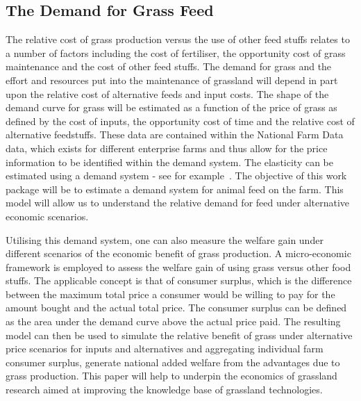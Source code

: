 \documentclass[12pt]{report}
\begin{document}
\subsection{The Demand for Grass Feed}
The relative cost of grass production versus the use of other feed stuffs relates to a number of factors including the cost of fertiliser, the opportunity cost of grass maintenance and the cost of other feed stuffs. The demand for grass and the effort and resources put into the maintenance of grassland will depend in part upon the relative cost of alternative feeds and input costs. The shape of the demand curve for grass will be estimated as a function of the price of grass as defined by the cost of inputs, the opportunity cost of time and the relative cost of alternative feedstuffs. These data are contained within the National Farm Data data, which exists for different enterprise farms and thus allow for the price information to be identified within the demand system. The elasticity can be estimated using a demand system - see for example~\citep{deaton80}. The objective of this work package will be to estimate a demand system for animal feed on the farm. This model will allow us to understand the relative demand for feed under alternative economic scenarios.

Utilising this demand system, one can also measure the welfare gain under different scenarios of the economic benefit of grass production. A micro-economic framework is employed to assess the welfare gain of using grass versus other food stuffs. The applicable concept  is that of consumer surplus, which is the difference between the maximum total price a consumer would be willing to pay for the amount bought and the actual total price. The consumer surplus can be defined as the area under the demand curve above the actual price paid. The resulting model can then be used to simulate the relative benefit of grass under alternative price scenarios for inputs and alternatives and aggregating individual farm consumer surplus, generate national added welfare from the advantages due to grass production. This paper will help to underpin the economics of grassland research aimed at improving the knowledge base of grassland technologies.
\end{document}
